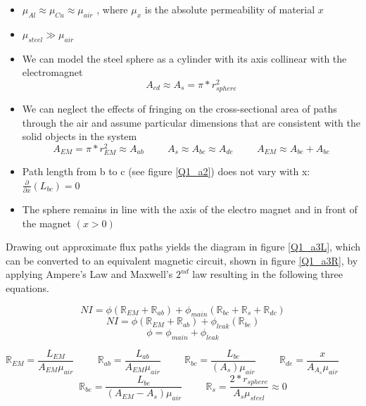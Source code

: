 \documentclass{article}
\theoremstyle{plain}
\theoremstyle{definition}
\theoremstyle{remark}
\begin{document}
\begin{itemize}
\item $ \mu_{Al} \approx \mu_{Cu} \approx \mu_{air} $ , where $\mu_x$ is the absolute permeability of material $x$
\item $ \mu_{steel} \gg \mu_{air} $
\item We can model the steel sphere as a cylinder with its axis collinear with the electromagnet  \\ 
$$A_{cd} \approx A_{s} = \pi * r_{sphere}^2 $$ 
\item We can neglect the effects of fringing on the cross-sectional area of paths through the air and assume particular dimensions that are consistent with the solid objects in the system \\
$$ A_{EM} = \pi*r_{EM}^2 \approx A_{ab} \hspace{1cm} A_{s} \approx A_{bc} \approx A_{de} \hspace{1cm} A_{EM} \approx A_{be} + A_{bc} $$ 
\item Path length from b to c (see figure \ref{Q1_a2}) does not vary with x: 
$ \frac{\partial}{\partial x} (L_{bc}) = 0$
\item The sphere remains in line with the axis of the electro magnet and in front of the magnet $( x > 0 )$
\end{itemize}

Drawing out approximate flux paths yields the diagram in figure \ref{Q1_a3L}, which can be converted to an equivalent magnetic circuit, shown in figure \ref{Q1_a3R}, by applying Ampere's Law and Maxwell's $2^{nd}$ law resulting in the following three equations. 

$$ NI = \phi \left (\mathbb{R}_{EM} + \mathbb{R}_{ab}\right) + \phi_{main} \left( \mathbb{R}_{bc}+\mathbb{R}_{s}+\mathbb{R}_{dc} \right) $$
$$ NI = \phi \left( \mathbb{R}_{EM} + \mathbb{R}_{ab} \right) + \phi_{leak} \left( \mathbb{R}_{be} \right) $$
$$ \phi = \phi_{main} + \phi_{leak} $$


$$ \mathbb{R}_{EM} = \frac{L_{EM}}{A_{EM}\mu_{air}}  \hspace{1cm} \mathbb{R}_{ab} = \frac{L_{ab}}{A_{EM}\mu_{air}} \hspace{1cm} \mathbb{R}_{bc} = \frac{L_{bc}}{(A_{s})\mu_{air}} \hspace{1cm} \mathbb{R}_{de} = \frac{x}{A_{A_{s}}\mu_{air}} \hspace{1cm} $$ $$ \mathbb{R}_{be} = \frac{L_{be}}{(A_{EM} - A_{s})\mu_{air}}  \hspace{1cm}  \mathbb{R}_{s} = \frac{2*r_{sphere}}{A_{s}\mu_{steel}} \approx 0$$
\end{document}

